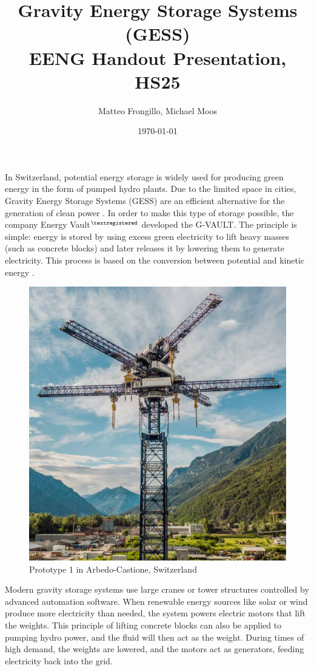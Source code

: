 \documentclass{article}
\title{\textbf{Gravity Energy Storage Systems (GESS) \\ EENG Handout Presentation, HS25}}
\author{Matteo Frongillo, Michael Moos}
\date{\today}
\begin{document}
\hypersetup{citecolor=black}
\maketitle
\linespread{1.2}\selectfont

In Switzerland, potential energy storage is widely used for producing
green energy in the form of pumped hydro plants. Due to the limited
space in cities, Gravity Energy Storage Systems (GESS) are an efficient
alternative for the generation of clean power \parencite{franklin2022}.
In order to make this type of storage possible, the company Energy Vault$^{\textregistered}$
developed the G-VAULT\texttrademark. The principle is simple: energy is stored by using
excess green electricity to lift heavy masses (such as concrete blocks) and later
releases it by lowering them to generate electricity. This process is based on the
conversion between potential and kinetic energy \parencite{energyvault2023}.

\vspace{-0.3cm}
\begin{figure}
    \includegraphics[width=.5\textwidth]{media/EV_prototype.png}
    \caption{Prototype 1 in Arbedo-Castione, Switzerland}
\end{figure}

\phantom{}

Modern gravity storage systems use large cranes or tower structures
controlled by advanced automation software. When renewable energy
sources like solar or wind produce more electricity than needed, the
system powers electric motors that lift the weights. This principle
of lifting concrete blocks can also be applied to pumping hydro
power, and the fluid will then act as the weight. During times of
high demand, the weights are lowered, and the motors act as
generators, feeding electricity back into the grid.
\wrapfill
\end{document}
